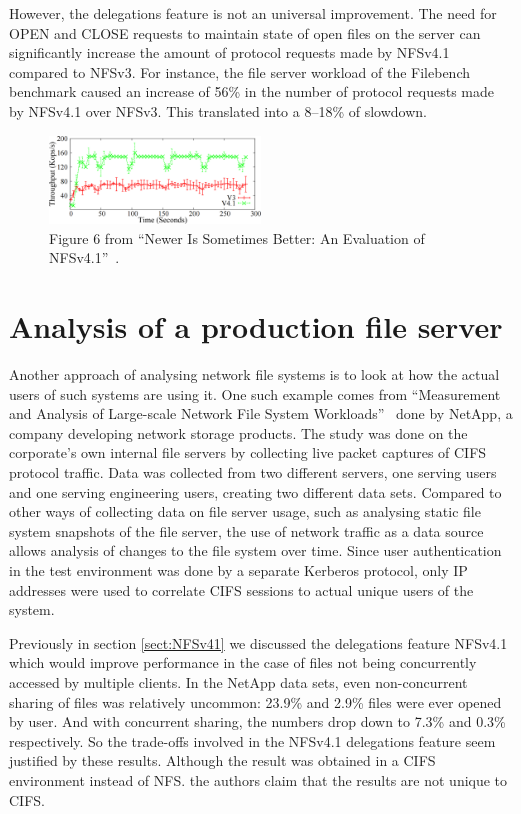 However, the delegations feature is not an universal improvement.
The need for OPEN and CLOSE requests to maintain state of open files on the server can significantly increase the amount of protocol requests made by NFSv4.1 compared to NFSv3.
For instance, the file server workload of the Filebench benchmark caused an increase of 56\% in the number of protocol requests made by NFSv4.1 over NFSv3.
This translated into a 8--18\% of slowdown.

\begin{figure}[h]
\centering\includegraphics[width=0.5\textwidth]{images/nfsv41better-reading-small-files.png}
\caption{Figure 6 from ``Newer Is Sometimes Better: An Evaluation of NFSv4.1''~\cite{NFSv4Better}.}
\label{fig:nfsv41randread}
\end{figure}

\section{Analysis of a production file server} \label{sect:NetAppAnalysis}

Another approach of analysing network file systems is to look at how the actual users of such systems are using it.
One such example comes from ``Measurement and Analysis of Large-scale Network File System Workloads''~\cite{NetApp} done by NetApp,
a company developing network storage products.
The study was done on the corporate's own internal file servers by collecting live packet captures of CIFS protocol traffic.
Data was collected from two different servers, one serving users and one serving engineering users, creating two different data sets.
Compared to other ways of collecting data on file server usage, such as analysing static file system snapshots of the file server,
the use of network traffic as a data source allows analysis of changes to the file system over time.
Since user authentication in the test environment was done by a separate Kerberos protocol,
only IP addresses were used to correlate CIFS sessions to actual unique users of the system.

Previously in section \ref{sect:NFSv41} we discussed the delegations feature NFSv4.1 which would improve performance in the case of files not being concurrently accessed by multiple clients.
In the NetApp data sets, even non-concurrent sharing of files was relatively uncommon: 23.9\% and 2.9\% files were ever opened by user.
And with concurrent sharing, the numbers drop down to 7.3\% and 0.3\% respectively.
So the trade-offs involved in the NFSv4.1 delegations feature seem justified by these results.
Although the result was obtained in a CIFS environment instead of NFS.
the authors claim that the results are not unique to CIFS.

